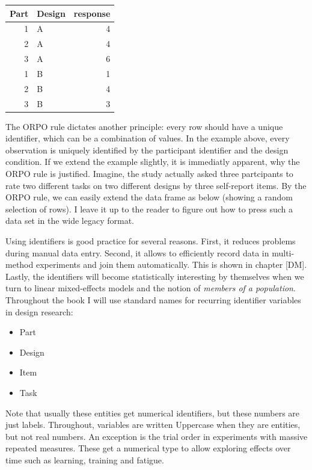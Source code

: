 \documentclass[]{svmono}
\providecommand{\tightlist}{%
  \setlength{\itemsep}{0pt}\setlength{\parskip}{0pt}}
\theoremstyle{definition}
\theoremstyle{definition}
\theoremstyle{definition}
\theoremstyle{remark}
\begin{document}
\begin{tabular}{r|l|r}
\hline
Part & Design & response\\
\hline
1 & A & 4\\
\hline
2 & A & 4\\
\hline
3 & A & 6\\
\hline
1 & B & 1\\
\hline
2 & B & 4\\
\hline
3 & B & 3\\
\hline
\end{tabular}

The ORPO rule dictates another principle: every row should have a unique
identifier, which can be a combination of values. In the example above,
every observation is uniquely identified by the participant identifier
and the design condition. If we extend the example slightly, it is
immediatly apparent, why the ORPO rule is justified. Imagine, the study
actually asked three partcipants to rate two different tasks on two
different designs by three self-report items. By the ORPO rule, we can
easily extend the data frame as below (showing a random selection of
rows). I leave it up to the reader to figure out how to press such a
data set in the wide legacy format.

Using identifiers is good practice for several reasons. First, it
reduces problems during manual data entry. Second, it allows to
efficiently record data in multi-method experiments and join them
automatically. This is shown in chapter {[}DM{]}. Lastly, the
identifiers will become statistically interesting by themselves when we
turn to linear mixed-effects models and the notion of \emph{members of a
population}. Throughout the book I will use standard names for recurring
identifier variables in design research:

\begin{itemize}
\tightlist
\item
  Part
\item
  Design
\item
  Item
\item
  Task
\end{itemize}

Note that usually these entities get numerical identifiers, but these
numbers are just labels. Throughout, variables are written Uppercase
when they are entities, but not real numbers. An exception is the trial
order in experiments with massive repeated measures. These get a
numerical type to allow exploring effects over time such as learning,
training and fatigue.
\end{document}
